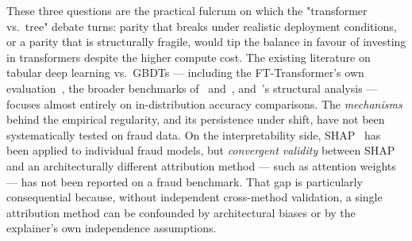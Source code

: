 \documentclass[a4paper,fleqn]{cas-sc}
\begin{document}
These three questions are the practical fulcrum on which the "transformer
vs.\ tree" debate turns: parity that breaks under realistic deployment
conditions, or a parity that is structurally fragile, would tip the balance in
favour of investing in transformers despite the higher compute cost.
The existing literature on tabular deep learning vs.\ GBDTs --- including
the FT-Transformer's own evaluation~\citep{gorishniy2021revisiting}, the
broader benchmarks of~\citet{shwartzziv2022tabular} and~\citet{borisov2022deep},
and~\citet{grinsztajn2022tree}'s structural analysis --- focuses almost entirely
on in-distribution accuracy comparisons.
The \emph{mechanisms} behind the empirical regularity, and its persistence
under shift, have not been systematically tested on fraud data.
On the interpretability side, SHAP~\citep{lundberg2017unified} has been applied
to individual fraud models, but \emph{convergent validity} between SHAP and
an architecturally different attribution method --- such as attention
weights --- has not been reported on a fraud benchmark.
That gap is particularly consequential because, without independent
cross-method validation, a single attribution method can be confounded by
architectural biases or by the explainer's own independence assumptions.
\end{document}
